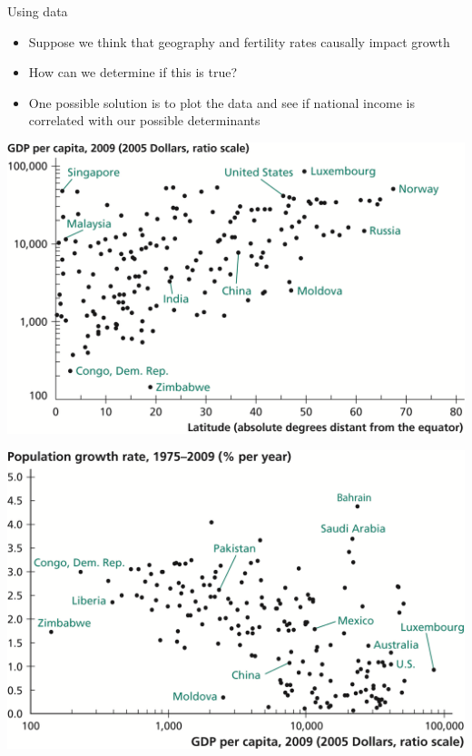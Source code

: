 \documentclass[10pt]{beamer}
\begin{document}
\begin{frame}[label={sec:org50d5b1c}]{}
\alert{Using data}
\begin{itemize}
\item Suppose we think that geography and fertility rates causally impact growth
\item How can we determine if this is true?
\item One possible solution is to plot the data and see if national income is correlated with our possible determinants
\end{itemize}
\end{frame}

\begin{frame}[label={sec:orga261f0f}]{}
\begin{center}
\includegraphics[width=.75\textwidth]{./img/2.3.png}
\end{center}
\end{frame}

\begin{frame}[label={sec:orga775876}]{}
\begin{center}
\includegraphics[width=.75\textwidth]{./img/2.4.png}
\end{center}
\end{frame}
\end{document}

